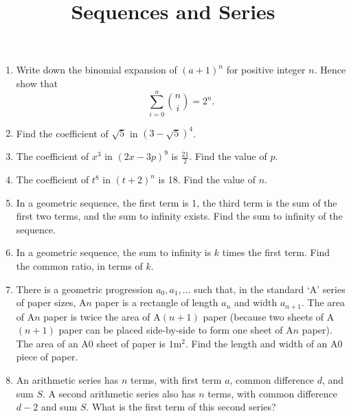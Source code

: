 \documentclass{article}
\begin{document}
\title{Sequences and Series}
\date{}

\maketitle
\thispagestyle{empty}

\Large





\begin{enumerate}
	\item Write down the binomial expansion of $(a+1)^n$ for positive integer $n$. Hence show that
		\[\sum_{i=0}^n {n\choose i} =2^n.\]
	\item Find the coefficient of $\sqrt{5}$ in $(3-\sqrt{5})^4$.
	\item The coefficient of $x^3$ in $(2x-3p)^9$ is $\frac{21}{2}$. Find the value of $p$.
	\item The coefficient of $t^8$ in $(t+2)^n$ is 18. Find the value of $n$.
	\item In a geometric sequence, the first term is 1, the third term is the sum of the first two terms, and the sum to infinity exists. Find the sum to infinity of the sequence.
	\item In a geometric sequence, the sum to infinity is $k$ times the first term. Find the common ratio, in terms of $k$.
	\item There is a geometric progression $a_0, a_1,\hdots$ such that, in the standard `A' series of paper sizes, A$n$ paper is a rectangle of length $a_n$ and width $a_{n+1}$. The area of A$n$ paper is twice the area of A$(n+1)$ paper (because two sheets of A$(n+1)$ paper can be placed side-by-side to form one sheet of A$n$ paper). The area of an A0 sheet of paper is $1\mathrm{m}^2$. Find the length and width of an A0 piece of paper.
	\item An arithmetic series has $n$ terms, with first term $a$, common difference $d$, and sum $S$. A second arithmetic series also has $n$ terms, with common difference $d-2$ and sum $S$. What is the first term of this second series?
\end{enumerate}
\end{document}
